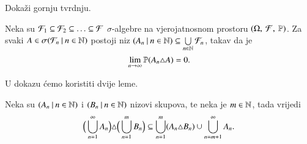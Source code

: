 \begin{nap} %
    Doka\v zi gornju tvrdnju.
\end{nap}

\begin{zad} \label{zad:9.10}
    Neka su $\mathcal{F}_1 \subseteq \mathcal{F}_2 \subseteq \ldots \subseteq \mathcal{F}$ $\sigma$-algebre na vjerojatnosnom prostoru $(\Omega, \: \mathcal{F}, \: \mathbb{P})$.
    Za svaki $A \in \sigma({\mathcal{F}_n} \: | \: {n \in \mathbb{N}})$ postoji niz $({A_n} \: | \: {n \in \mathbb{N}}) \subseteq \bigcup\limits_{n \in \mathbb{N}}^{} \mathcal{F}_n$, takav da je
    \begin{equation*}
        \lim\limits_{n \to \infty} \mathbb{P}({A_n \triangle A}) = 0.
    \end{equation*}
\end{zad}

\begin{rj}[\ref{zad:9.10}]
    U dokazu \' cemo koristiti dvije leme.

    \begin{lm}  \label{lm:9.10-1}
        Neka su $({A_n} \: | \: {n \in \mathbb{N}})$ i $({B_n} \: | \: {n \in \mathbb{N}})$ nizovi skupova, te neka je $m \in \mathbb{N}$, tada vrijedi
        \begin{equation*}
            \Big( \bigcup\limits_{n = 1}^{\infty} A_n \Big) \triangle \Big( \bigcup\limits_{n = 1}^{m} B_n \Big) \subseteq \bigcup\limits_{n = 1}^{m} (A_n \triangle B_n) \cup \bigcup\limits_{n = m + 1}^{\infty} A_n.
        \end{equation*}
    \end{lm}


\end{rj}
